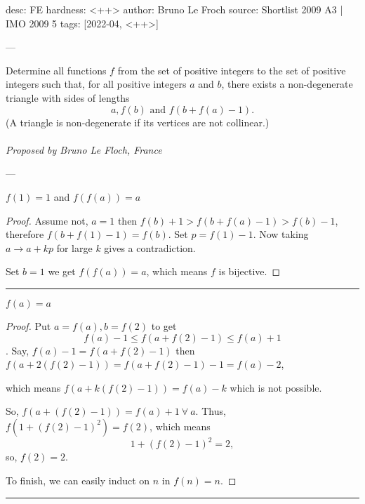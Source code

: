 desc: FE
hardness: <++>
author: Bruno Le Froch
source: Shortlist 2009 A3 | IMO 2009 5
tags: [2022-04, <++>]

---

Determine all functions $ f$ from the set of positive integers to the set of positive integers such that, for all positive integers $ a$ and $ b$, there exists a non-degenerate triangle with sides of lengths
\[ a, f(b) \text{ and } f(b + f(a) - 1). \]
(A triangle is non-degenerate if its vertices are not collinear.) \\\\
\textit{Proposed by Bruno Le Floch, France}

---

\begin{claim*}
  $f(1) = 1$ and $f(f(a)) = a$
\end{claim*}
\begin{proof}
  Assume not, $a = 1$ then $f(b) + 1 > f(b+f(a)-1) > f(b)-1$, therefore
  $f(b+f(1)-1) = f(b)$. Set $p = f(1) - 1$. Now taking $a \to a + kp$ 
  for large $k$ gives a contradiction.  

  Set $b=1$ we get $f(f(a)) =a$, which means $f$ is bijective.
\end{proof}
\hrule
\begin{claim*}
  $f(a) = a$
\end{claim*}
\begin{proof}
  Put $a = f(a), b = f(2)$ to get 
  \[f(a) - 1 \leq f(a + f(2) - 1) \leq f(a) + 1\].
  Say, $f(a) - 1 = f(a + f(2) - 1)$ then $f(a + 2(f(2)-1)) = f(a + f(2) - 1)-1 = f(a) - 2$,
  
  which means $f(a + k(f(2) - 1)) = f(a) - k$ which is not possible.

  So, $f(a + (f(2) - 1)) = f(a) + 1 \ \forall \ a$. Thus,
  $f(1 + (f(2) - 1)^2) = f(2)$, which means 
  \[1 + (f(2) - 1)^2 = 2,\] so, $f(2)=2$.

  To finish, we can easily induct on $n$ in $f(n) = n$. 
\end{proof}
\hrule

\bigskip
\bigskip
